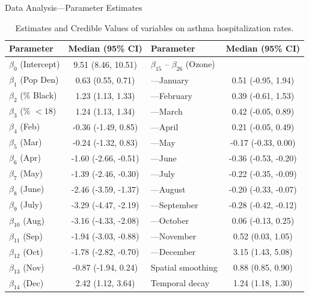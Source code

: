 \documentclass[
10pt]{beamer}
\begin{document}
\begin{frame}{Data Analysis---Parameter Estimates}
\begin{table}[F] %
\scriptsize
\begin{center}
\begin{tabular}{l|c||l|c}
\hline
Parameter & Median (95\% CI)  & Parameter & Median (95\% CI)\\
\hline
$\beta_{0}$ (Intercept)	&	9.51 (8.46, 10.51)	&	$\beta_{15}$ -- $\beta_{26}$ (Ozone)	&	\\		
$\beta_{1}$ (Pop Den)	&	0.63 (0.55, 0.71)	&	---\;January	&	0.51 (-0.95, 1.94)	\\
$\beta_{2}$ (\% Black)	&	1.23 (1.13, 1.33)	&	---\;February	&	0.39 (-0.61, 1.53)	\\
$\beta_{3}$ (\% $< 18$)	&	1.24 (1.13, 1.34)	&	---\;March	&	0.42 (-0.05, 0.89)	\\
$\beta_{4}$ (Feb)	&	-0.36 (-1.49, 0.85)	&	---\;April	&	0.21 (-0.05, 0.49)	\\
$\beta_{5}$ (Mar)	&	-0.24 (-1.32, 0.83)	&	---\;May	& 	-0.17 (-0.33, 0.00)	\\
$\beta_{6}$ (Apr)	&	-1.60 (-2.66, -0.51)	&	---\;June	&	-0.36 (-0.53, -0.20)	\\
$\beta_{7}$ (May)	&	-1.39 (-2.46, -0.30)	&	---\;July	&	-0.22 (-0.35, -0.09)	\\
$\beta_{8}$ (June)	&	-2.46 (-3.59, -1.37)	&	---\;August	&	-0.20 (-0.33, -0.07)	\\
$\beta_{9}$ (July)	&	-3.29 (-4.47, -2.19)	&	---\;September	&	-0.28 (-0.42, -0.12)	\\
$\beta_{10}$ (Aug)	&	-3.16 (-4.33, -2.08)	&	---\;October	&	 0.06 (-0.13, 0.25)	\\
$\beta_{11}$ (Sep)	&	-1.94 (-3.03, -0.88)	&	---\;November	&	 0.52 (0.03, 1.05)	\\
$\beta_{12}$ (Oct)	&	-1.78 (-2.82, -0.70)	&	---\;December	&	3.15 (1.43, 5.08)	\\
$\beta_{13}$ (Nov)	&	-0.87 (-1.94, 0.24)	&	Spatial smoothing	&	0.88 (0.85, 0.90)	\\
$\beta_{14}$ (Dec)	&	 2.42 (1.12, 3.64)	&	Temporal decay		&	1.24 (1.18, 1.30)	\\
\hline							
\end{tabular}
\end{center}
  \caption{Estimates and Credible Values of variables on asthma hospitalization rates.}
  \label{tab:asthma} %
\end{table}
\end{frame}
 
\end{document}

